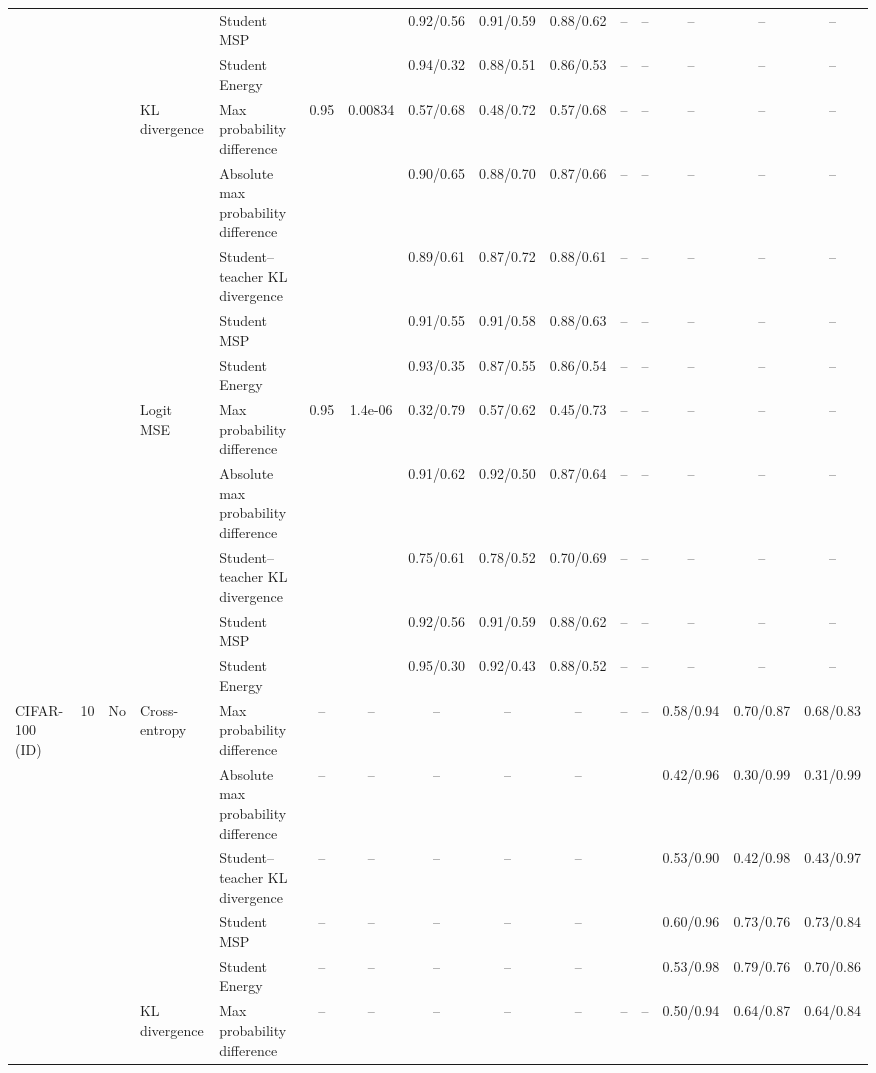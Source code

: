 \documentclass[border=2pt]{standalone}
\begin{document}
\begin{tabular}{lllllcccccccccc}
 &  &  &  & Student MSP &  &  & 0.92/0.56 & 0.91/0.59 & 0.88/0.62 & -- & -- & -- & -- & -- \\
 &  &  &  & Student Energy &  &  & 0.94/0.32 & 0.88/0.51 & 0.86/0.53 & -- & -- & -- & -- & -- \\
 &  &  & KL divergence & Max probability difference & 0.95 & 0.00834 & 0.57/0.68 & 0.48/0.72 & 0.57/0.68 & -- & -- & -- & -- & -- \\
 &  &  &  & Absolute max probability difference &  &  & 0.90/0.65 & 0.88/0.70 & 0.87/0.66 & -- & -- & -- & -- & -- \\
 &  &  &  & Student--teacher KL divergence &  &  & 0.89/0.61 & 0.87/0.72 & 0.88/0.61 & -- & -- & -- & -- & -- \\
 &  &  &  & Student MSP &  &  & 0.91/0.55 & 0.91/0.58 & 0.88/0.63 & -- & -- & -- & -- & -- \\
 &  &  &  & Student Energy &  &  & 0.93/0.35 & 0.87/0.55 & 0.86/0.54 & -- & -- & -- & -- & -- \\
 &  &  & Logit MSE & Max probability difference & 0.95 & 1.4e-06 & 0.32/0.79 & 0.57/0.62 & 0.45/0.73 & -- & -- & -- & -- & -- \\
 &  &  &  & Absolute max probability difference &  &  & 0.91/0.62 & 0.92/0.50 & 0.87/0.64 & -- & -- & -- & -- & -- \\
 &  &  &  & Student--teacher KL divergence &  &  & 0.75/0.61 & 0.78/0.52 & 0.70/0.69 & -- & -- & -- & -- & -- \\
 &  &  &  & Student MSP &  &  & 0.92/0.56 & 0.91/0.59 & 0.88/0.62 & -- & -- & -- & -- & -- \\
 &  &  &  & Student Energy &  &  & 0.95/0.30 & 0.92/0.43 & 0.88/0.52 & -- & -- & -- & -- & -- \\
\addlinespace
CIFAR-100 (ID) & 10 & No & Cross-entropy & Max probability difference & -- & -- & -- & -- & -- & -- & -- & 0.58/0.94 & 0.70/0.87 & 0.68/0.83 \\
 &  &  &  & Absolute max probability difference & -- & -- & -- & -- & -- &  &  & 0.42/0.96 & 0.30/0.99 & 0.31/0.99 \\
 &  &  &  & Student--teacher KL divergence & -- & -- & -- & -- & -- &  &  & 0.53/0.90 & 0.42/0.98 & 0.43/0.97 \\
 &  &  &  & Student MSP & -- & -- & -- & -- & -- &  &  & 0.60/0.96 & 0.73/0.76 & 0.73/0.84 \\
 &  &  &  & Student Energy & -- & -- & -- & -- & -- &  &  & 0.53/0.98 & 0.79/0.76 & 0.70/0.86 \\
 &  &  & KL divergence & Max probability difference & -- & -- & -- & -- & -- & -- & -- & 0.50/0.94 & 0.64/0.87 & 0.64/0.84 \\

\end{tabular}
\end{document}
